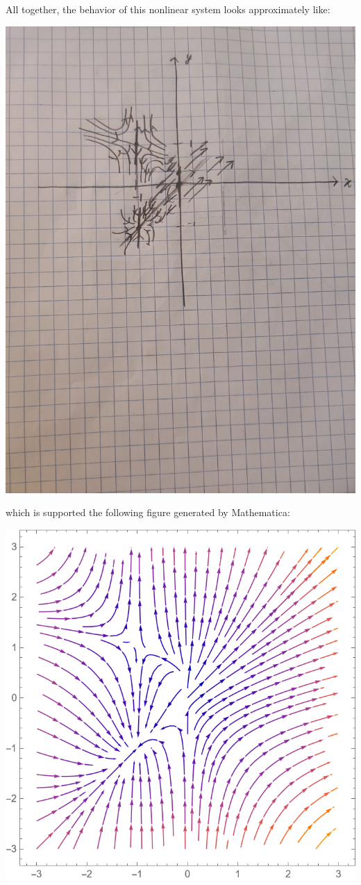 \documentclass{article}
\begin{document}
\begin{itemize}
\begin{itemize}
        All together, the behavior of this nonlinear system looks approximately like:
        \begin{center}
            \includegraphics[scale = 0.05]{prob2a_sketch.jpg}
        \end{center}
        which is supported the following figure generated by Mathematica:
        \begin{center}
            \includegraphics[scale = 0.5]{prob2a_stream.png}

\end{center}
\end{itemize}
\end{itemize}
\end{document}
